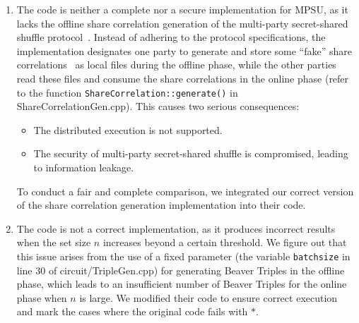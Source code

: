 \begin{enumerate}
  \item The code is neither a complete nor a secure implementation for MPSU, as it lacks the offline share correlation generation of the multi-party secret-shared shuffle protocol~\cite{EB22}. Instead of adhering to the protocol specifications, the implementation designates one party to generate and store some ``fake'' share correlations~\cite{EB22} as local files during the offline phase, while the other parties read these files and consume the share correlations in the online phase (refer to the function \texttt{ShareCorrelation::generate()} in ShareCorrelationGen.cpp). This causes two serious consequences: 
  \begin{itemize}
  \item The distributed execution is not supported. 
  \item The security of multi-party secret-shared shuffle is compromised, leading to information leakage.
  \end{itemize} 
  To conduct a fair and complete comparison, we integrated our correct version of the share correlation generation implementation into their code. 
  \item The code is not a correct implementation, as it produces incorrect results when the set size $n$ increases beyond a certain threshold. We figure out that this issue arises from the use of a fixed parameter (the variable \texttt{batchsize} in line 30 of circuit/TripleGen.cpp) for generating Beaver Triples in the offline phase, which leads to an insufficient number of Beaver Triples for the online phase when $n$ is large. We modified their code to ensure correct execution and mark the cases where the original code fails with $*$.
\end{enumerate}

